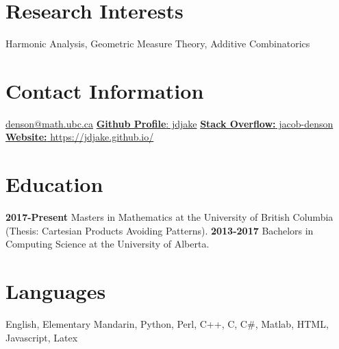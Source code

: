 \documentclass[a4paper]{cv-friggeri}
\begin{document}


\begin{aside} %
\section{Research Interests}
Harmonic Analysis, Geometric Measure Theory, Additive Combinatorics
~
\section{Contact Information}
\href{mailto:denson@math.ubc.ca}{denson@math.ubc.ca}
\href{https://github.com/jdjake}{{\bf Github Profile}: jdjake}
\href{http://stackoverflow.com/users/2601483/jacob-denson}{{\bf Stack Overflow:} jacob-denson}
\href{https://jdjake.github.io/}{{\bf Website:} https://jdjake.github.io/}
~
\section{Education}
{\bf 2017-Present}
Masters in Mathematics at the University of British Columbia (Thesis: Cartesian Products Avoiding Patterns).
{\bf 2013-2017}
Bachelors in Computing Science at the University of Alberta.
\section{Languages}
English, Elementary Mandarin, Python, Perl, C++, C, C\#, Matlab, HTML, Javascript, Latex
\end{aside}
\end{document}
